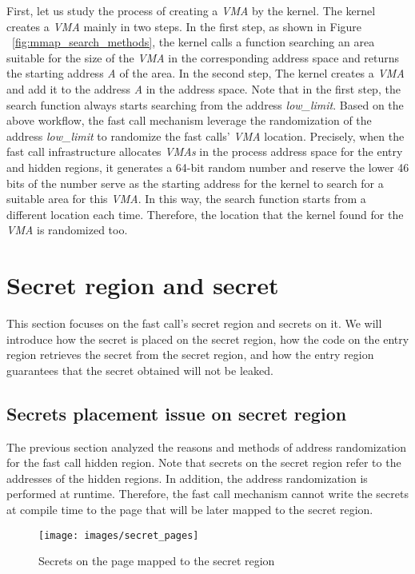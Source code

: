 First, let us study the process of creating a \emph{VMA} by the kernel. 
The kernel creates a \emph{VMA} mainly in two steps. In the first step, 
as shown in Figure ~\ref{fig:mmap_search_methods}, the kernel calls 
a function searching an area suitable for the size of the \emph{VMA}  in the corresponding 
address space and returns the starting address \emph{A} of the area. In the second step, 
The kernel creates a \emph{VMA} and add it to the address \emph{A} in the address space.  
Note that in the first step, the search 
function always starts searching from the address \emph{low\_limit}.
Based on the above workflow, the fast call mechanism leverage the randomization 
of the address \emph{low\_limit} to randomize the fast calls' \emph{VMA} location. Precisely,  
when the fast call infrastructure allocates \emph{VMAs} in the process address space for 
the entry and hidden regions, it generates a 64-bit random number and 
reserve the lower 46  bits of the number serve as the starting address for 
the kernel to search for a suitable area for this \emph{VMA}. In this way, the search 
function starts from a different location each time. Therefore,  the location 
that the kernel found for the \emph{VMA} is randomized too. 


\section{Secret region and secret}

This section focuses on the fast call's secret region and 
secrets on it. We will introduce how the secret is placed on the secret region, how the code on 
the entry region retrieves the secret from the secret region, 
and how the entry region guarantees that the secret obtained will not be leaked.

\subsection{Secrets placement issue on secret region}
The previous section analyzed the reasons and methods of address randomization 
for the fast call hidden region. Note that secrets on the secret region refer 
to the addresses of the hidden regions. In addition, the address randomization 
is performed at runtime. Therefore, the fast call mechanism cannot write the 
secrets at compile time to the page that will be later mapped to the secret region.

\begin{figure}[tbp]
  \centering
  \texttt{[image: images/secret\_pages]}
  \caption[Secrets on the page mapped to the secret region]{Secrets on the page mapped to the secret region}
  \label{fig:secret_pages}
\end{figure}

